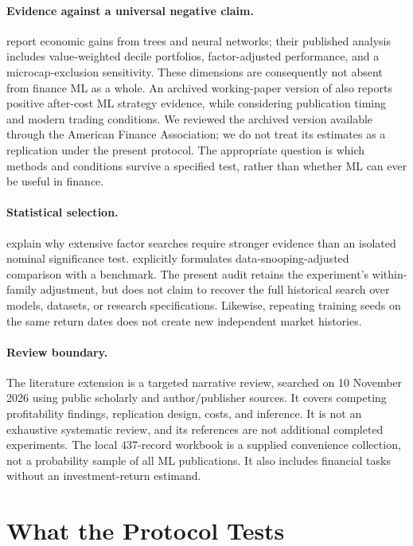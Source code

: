 \documentclass{article}
\begin{document}
\paragraph{Evidence against a universal negative claim.}
\cite{gu2020} report economic gains from trees and neural networks; their published analysis includes value-weighted decile portfolios, factor-adjusted performance, and a microcap-exclusion sensitivity. These dimensions are consequently not absent from finance ML as a whole. An archived working-paper version of \cite{azevedo} also reports positive after-cost ML strategy evidence, while considering publication timing and modern trading conditions. We reviewed the archived version available through the American Finance Association; we do not treat its estimates as a replication under the present protocol. The appropriate question is which methods and conditions survive a specified test, rather than whether ML can ever be useful in finance.

\paragraph{Statistical selection.}
\cite{harvey2016} explain why extensive factor searches require stronger evidence than an isolated nominal significance test. \cite{white2000} explicitly formulates data-snooping-adjusted comparison with a benchmark. The present audit retains the experiment's within-family adjustment, but does not claim to recover the full historical search over models, datasets, or research specifications. Likewise, repeating training seeds on the same return dates does not create new independent market histories.

\paragraph{Review boundary.}
The literature extension is a targeted narrative review, searched on 10 November 2026 using public scholarly and author/publisher sources. It covers competing profitability findings, replication design, costs, and inference. It is not an exhaustive systematic review, and its references are not additional completed experiments. The local 437-record workbook is a supplied convenience collection, not a probability sample of all ML publications. It also includes financial tasks without an investment-return estimand.

\section{What the Protocol Tests}
\end{document}
